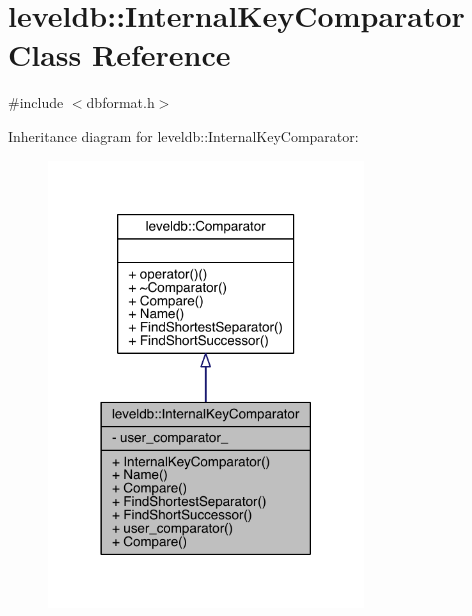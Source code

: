 \hypertarget{classleveldb_1_1_internal_key_comparator}{}\section{leveldb\+:\+:Internal\+Key\+Comparator Class Reference}
\label{classleveldb_1_1_internal_key_comparator}


{\ttfamily \#include $<$dbformat.\+h$>$}



Inheritance diagram for leveldb\+:\+:Internal\+Key\+Comparator\+:\nopagebreak
\begin{figure}[H]
\begin{center}
\leavevmode
\includegraphics[width=237pt]{classleveldb_1_1_internal_key_comparator__inherit__graph}
\end{center}
\end{figure}


